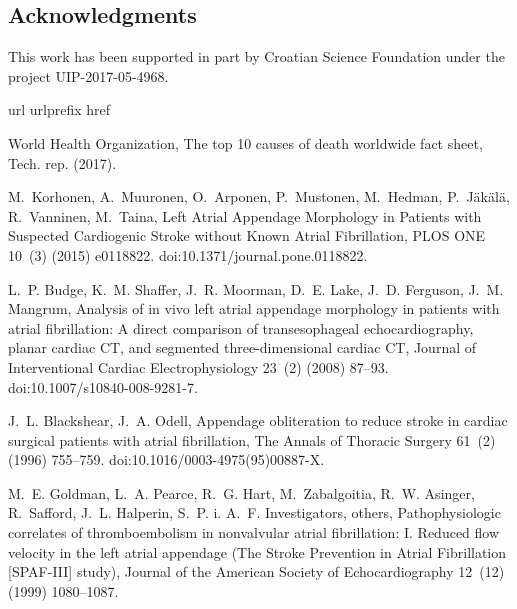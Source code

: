 \documentclass[review]{elsarticle}
\begin{document}
\subsection{Acknowledgments}
This work has been supported in part by Croatian Science Foundation under the project UIP-2017-05-4968.






     

\begin{thebibliography}{10}
\expandafter\ifx\csname url\endcsname\relax
  \def\url#1{\texttt{#1}}\fi
\expandafter\ifx\csname urlprefix\endcsname\relax\def\urlprefix{URL }\fi
\expandafter\ifx\csname href\endcsname\relax
  \def\href#1#2{#2} \def\path#1{#1}\fi

{World Health Organization}, The top 10 causes of death worldwide fact sheet,
  Tech. rep. (2017).

M.~Korhonen, A.~Muuronen, O.~Arponen, P.~Mustonen, M.~Hedman, P.~J\"ak\"al\"a,
  R.~Vanninen, M.~Taina, Left {{Atrial Appendage Morphology}} in {{Patients}}
  with {{Suspected Cardiogenic Stroke}} without {{Known Atrial Fibrillation}},
  PLOS ONE 10~(3) (2015) e0118822.
\newblock \href {http://dx.doi.org/10.1371/journal.pone.0118822}
  {\path{doi:10.1371/journal.pone.0118822}}.

L.~P. Budge, K.~M. Shaffer, J.~R. Moorman, D.~E. Lake, J.~D. Ferguson, J.~M.
  Mangrum, Analysis of in vivo left atrial appendage morphology in patients
  with atrial fibrillation: A direct comparison of transesophageal
  echocardiography, planar cardiac {{CT}}, and segmented three-dimensional
  cardiac {{CT}}, Journal of Interventional Cardiac Electrophysiology 23~(2)
  (2008) 87--93.
\newblock \href {http://dx.doi.org/10.1007/s10840-008-9281-7}
  {\path{doi:10.1007/s10840-008-9281-7}}.

J.~L. Blackshear, J.~A. Odell, Appendage obliteration to reduce stroke in
  cardiac surgical patients with atrial fibrillation, The Annals of Thoracic
  Surgery 61~(2) (1996) 755--759.
\newblock \href {http://dx.doi.org/10.1016/0003-4975(95)00887-X}
  {\path{doi:10.1016/0003-4975(95)00887-X}}.

M.~E. Goldman, L.~A. Pearce, R.~G. Hart, M.~Zabalgoitia, R.~W. Asinger,
  R.~Safford, J.~L. Halperin, S.~P. i. A.~F. Investigators, {others},
  Pathophysiologic correlates of thromboembolism in nonvalvular atrial
  fibrillation: {{I}}. {{Reduced}} flow velocity in the left atrial appendage
  ({{The Stroke Prevention}} in {{Atrial Fibrillation}} [{{SPAF}}-{{III}}]
  study), Journal of the American Society of Echocardiography 12~(12) (1999)
  1080--1087.


\end{thebibliography}
\end{document}
